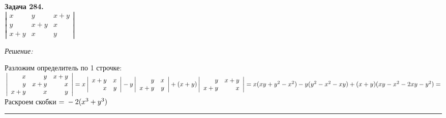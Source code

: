\documentclass[a4paper, 12pt]{article}
\newenvironment{problem}[2][Задача]
    { \begin{mdframed}[backgroundcolor=gray!10] \textbf{#1 #2.} \\}
    {  \end{mdframed}}
\newenvironment{solution}
    {\textit{Решение: }}
    {\noindent\rule{7in}{1.5pt}}
\begin{document}
\begin{problem}{284}
$\left| \begin{array}{rrr}x & y & x+y \\ y & x+y & x \\ x+y & x & y \end{array} \right|$
\end{problem}
\begin{solution}

Разложим определитель по 1 строчке: \\
$
\left|
\begin{array}{rrr}
  x & y & x+y \\
  y & x+y & x \\
  x+y & x & y
\end{array}
\right|
=
x
\left|
\begin{array}{rrr}
  x+y & x \\
  x & y
\end{array}
\right|
-
y
\left|
\begin{array}{rrr}
  y & x \\
  x+y & y
\end{array}
\right|
+
(x + y)
\left|
\begin{array}{rrr}
  y & x+y \\
  x+y & x
\end{array}
\right|
=
\\
\\
x(xy + y^2 -x^2) - y(y^2 - x^2 - xy) + (x + y)(xy - x^2 - 2xy - y^2) =$ Раскроем скобки $= \\
-2(x^3 + y^3)
$

\end{solution}

\end{document}
